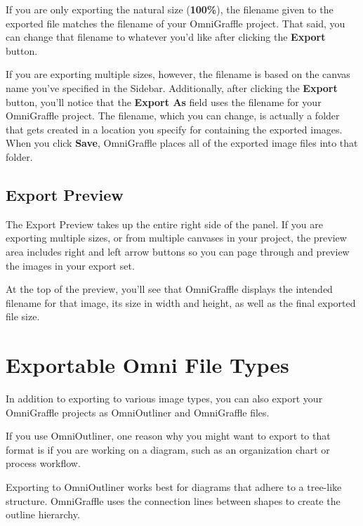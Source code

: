 \documentclass[../main.tex]{subfiles}
\begin{document}
If you are only exporting the natural size (\textbf{100\%}), the filename given to the exported
file matches the filename of your OmniGraffle project. That said, you can change that filename
to whatever you'd like after clicking the \textbf{Export} button.

If you are exporting multiple sizes, however, the filename is based on the canvas name you've
specified in the Sidebar. Additionally, after clicking the \textbf{Export} button, you'll
notice that the \textbf{Export As} field uses the filename for your OmniGraffle project. The
filename, which you can change, is actually a folder that gets created in a location you
specify for containing the exported images. When you click \textbf{Save}, OmniGraffle places
all of the exported image files into that folder.



\subsection{Export Preview}

The Export Preview takes up the entire right side of the panel. If you are exporting multiple
sizes, or from multiple canvases in your project, the preview area includes right and left
arrow buttons so you can page through and preview the images in your export set.


At the top of the preview, you'll see that OmniGraffle displays the intended filename for that
image, its size in width and height, as well as the final exported file size.

\section{Exportable Omni File Types}

In addition to exporting to various image types, you can also export your OmniGraffle projects
as OmniOutliner and OmniGraffle files.

If you use OmniOutliner, one reason why you might want to export to that format is if you are
working on a diagram, such as an organization chart or process workflow.


Exporting to OmniOutliner works best for diagrams that adhere to a tree-like structure.
OmniGraffle uses the connection lines between shapes to create the outline hierarchy.
\end{document}
